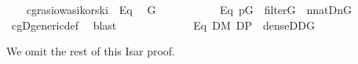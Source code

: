 \begin{isabellebody}
\isanewline
\ \ \isamarkupfalse%
\ cg{\isachardot}rasiowa{\isacharunderscore}sikorski\ \ Eq{}\ \isamarkupfalse%
\ G\ \ \isanewline
\ \ \ \ \ \ \ \ \ Eq{}{\isacharcolon}\ {\isachardoublequoteopen}p{\isasymin}G\ {\isasymand}\ filter{\isacharparenleft}G{\isacharparenright}\ {\isasymand}\ {\isacharparenleft}{\isasymforall}n{\isasymin}nat{\isachardot}{\isacharparenleft}{\isacharquery}D{\isacharbackquote}n{\isacharparenright}{\isasyminter}G{\isasymnoteq}{}{\isacharparenright}{\isachardoublequoteclose}\isanewline
\ \ \ \ \isamarkupfalse%
\ cg{\isachardot}D{\isacharunderscore}generic{\isacharunderscore}def\ \isamarkupfalse%
\ blast\isanewline
\ \ \isamarkupfalse%
\ \isamarkupfalse%
\isanewline
\ \ \ \ \ \ \ \ \ Eq{}{\isacharcolon}\ {\isachardoublequoteopen}{\isacharparenleft}{\isasymforall}D{\isasymin}M{\isachardot}\ D{\isasymsubseteq}P\ {\isasymand}\ dense{\isacharparenleft}D{\isacharparenright}{\isasymlongrightarrow}D{\isasyminter}G{\isasymnoteq}{}{\isacharparenright}{\isachardoublequoteclose}\isanewline
\end{isabellebody}

We omit the rest of this Isar proof.

